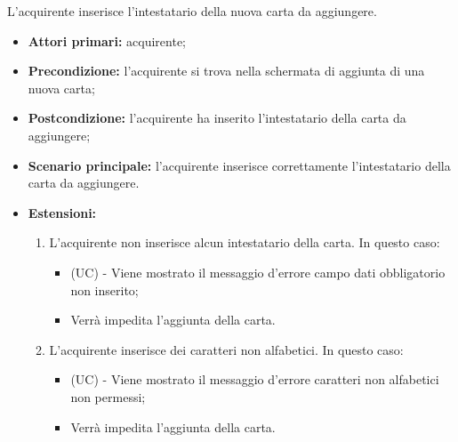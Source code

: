 \resetSubSubUC

L'acquirente inserisce l'intestatario della nuova carta da aggiungere.
\begin{itemize}
    \item \textbf{Attori primari:} acquirente;
    \item \textbf{Precondizione:} l'acquirente si trova nella schermata di aggiunta di una nuova carta;
    \item \textbf{Postcondizione:} l'acquirente ha inserito l'intestatario della carta da aggiungere;
    \item \textbf{Scenario principale:} l'acquirente inserisce correttamente l'intestatario della carta da aggiungere.
    \item \textbf{Estensioni:}
    \begin{enumerate}[label=\lett]
        \item L'acquirente non inserisce alcun intestatario della carta. In questo caso:
        \begin{itemize}
            \item (UC) - Viene mostrato il messaggio d'errore campo dati obbligatorio non inserito;
            \item Verrà impedita l'aggiunta della carta.
        \end{itemize}
        \item L'acquirente inserisce dei caratteri non alfabetici. In questo caso:
        \begin{itemize}
            \item (UC) - Viene mostrato il messaggio d'errore caratteri non alfabetici non permessi;
            \item Verrà impedita l'aggiunta della carta.
        \end{itemize}
    \end{enumerate}
\end{itemize}

